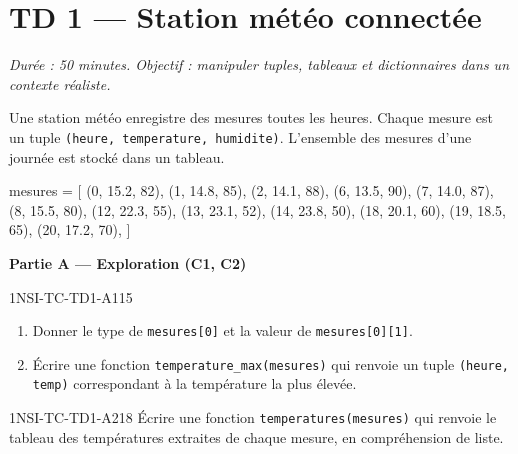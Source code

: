 \section*{TD 1 --- Station météo connectée}
\textit{Durée : 50 minutes. Objectif : manipuler tuples, tableaux et dictionnaires
dans un contexte réaliste.}

\bigskip

Une station météo enregistre des mesures toutes les heures. Chaque mesure est un
tuple \lstinline{(heure, temperature, humidite)}. L'ensemble des mesures d'une
journée est stocké dans un tableau.

\begin{python}
mesures = [
    (0, 15.2, 82), (1, 14.8, 85), (2, 14.1, 88),
    (6, 13.5, 90), (7, 14.0, 87), (8, 15.5, 80),
    (12, 22.3, 55), (13, 23.1, 52), (14, 23.8, 50),
    (18, 20.1, 60), (19, 18.5, 65), (20, 17.2, 70),
]
\end{python}

\textbf{Partie A --- Exploration (C1, C2)}

\begin{exercice}{1NSI-TC-TD1-A1}{1}{5}
\begin{enumerate}
  \item Donner le type de \lstinline{mesures[0]} et la valeur de
        \lstinline{mesures[0][1]}.
  \item Écrire une fonction \lstinline{temperature_max(mesures)}
        qui renvoie un tuple \lstinline{(heure, temp)}
        correspondant à la température la plus élevée.
\end{enumerate}
\end{exercice}


\begin{exercice}{1NSI-TC-TD1-A2}{1}{8}
Écrire une fonction \lstinline{temperatures(mesures)} qui renvoie le tableau
des températures extraites de chaque mesure, en compréhension de liste.
\end{exercice}

